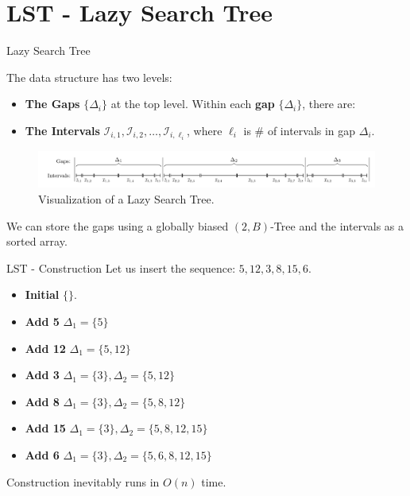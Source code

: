 \documentclass[aspectratio=169,xcolor=dvipsnames]{beamer}
\begin{document}

\section{LST - Lazy Search Tree}
\begin{frame}{Lazy Search Tree}

The data structure has two levels:

\begin{itemize}
    \item \textbf{The Gaps} $\{\Delta_i\}$ at the top level. Within each \textbf{gap} $\{\Delta_i\}$, there are:
    \item \textbf{The Intervals} $\mathcal{I}_{i,1},\mathcal{I}_{i,2},\dots,\mathcal{I}_{i,\ell_i}$, where $\ell_i$ is \# of intervals in gap $\Delta_i$.
\end{itemize}

\begin{figure}[h]
    \centering
    \includegraphics[width=0.8\linewidth]{lst.png}
    \caption{Visualization of a Lazy Search Tree.}
\end{figure}

We can store the gaps using a globally biased $(2,B)$-Tree and the intervals as a sorted array.

\end{frame}


\begin{frame}{LST - Construction}
Let us insert the sequence: $5, 12, 3, 8, 15, 6$.

\begin{itemize}
    \item \textbf{Initial} $\{\}$.
    \item \textbf{Add 5} $\Delta_1 = \{5\}$
    \item \textbf{Add 12} $\Delta_1 = \{5, 12\}$
    \item \textbf{Add 3} $\Delta_1 = \{3\}, \Delta_2 = \{5, 12\}$
    \item \textbf{Add 8} $\Delta_1 = \{3\}, \Delta_2 = \{5, 8, 12\}$
    \item \textbf{Add 15} $\Delta_1 = \{3\}, \Delta_2 = \{5, 8, 12, 15\}$
    \item \textbf{Add 6} $\Delta_1 = \{3\}, \Delta_2 = \{5, 6, 8, 12, 15\}$
\end{itemize}

\vspace{1cm}

Construction inevitably runs in $O(n)$ time.

\end{frame}
\end{document}
